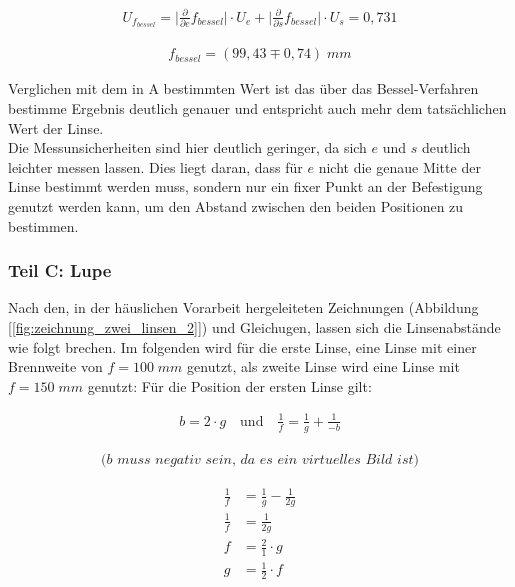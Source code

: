 \documentclass[a4paper]{scrartcl}
\numberwithin{equation}{subsection}
\begin{document}
\begin{align*}
U_{f_{\textit{bessel}}} = \bigg | \frac{\partial}{\partial e} f_{\textit{bessel}} \bigg | \cdot U_{e} + 
					    \bigg | \frac{\partial}{\partial s} f_{\textit{bessel}} \bigg | \cdot U_{s} = 0,731
\end{align*}

\begin{align*}
f_{\textit{bessel}} = (99,43 \mp 0,74) \;mm
\end{align*}

Verglichen mit dem in A bestimmten Wert ist das über das Bessel-Verfahren bestimme Ergebnis deutlich genauer und entspricht auch mehr dem tatsächlichen Wert der Linse. \\

Die Messunsicherheiten sind hier deutlich geringer, da sich $e$ und $s$ deutlich leichter messen lassen. Dies liegt daran, dass für $e$ nicht die genaue Mitte der Linse bestimmt werden muss, sondern nur ein fixer Punkt an der Befestigung genutzt werden kann, um den Abstand zwischen den beiden Positionen zu bestimmen.


\subsubsection{Teil C: Lupe}

Nach den, in der häuslichen Vorarbeit hergeleiteten Zeichnungen (Abbildung [\ref{fig:zeichnung_zwei_linsen_2}]) und Gleichugen, lassen sich die Linsenabstände wie folgt brechen.
Im folgenden wird für die erste Linse, eine Linse mit einer Brennweite von $f = 100 \;mm$ genutzt, als zweite Linse wird eine Linse mit $f = 150 \;mm$ genutzt:
Für die Position der ersten Linse gilt:

\begin{align*}
b = 2 \cdot g \quad \text{und} \quad \frac{1}{f} = \frac{1}{g} + \frac{1}{-b}
\end{align*}

\begin{align*}
\textit{(b muss negativ sein, da es ein virtuelles Bild ist)}
\end{align*}

\begin{align*}
\frac{1}{f} &= \frac{1}{g} - \frac{1}{2g} \\
\frac{1}{f} &= \frac{1}{2g} \\
f &= \frac{2}{1}\cdot g \\
g &= \frac{1}{2}\cdot f
\end{align*}
\end{document}
